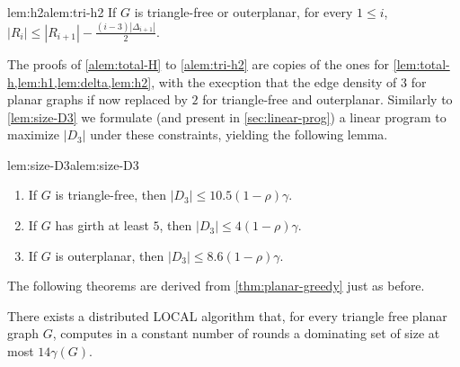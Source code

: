 \begin{adapted}{lem:h2}{alem:tri-h2}
  If $G$ is triangle-free or outerplanar,
  for every $1\le i$, $|R_i| \le |R_{i+1}| - \frac{(i-3)|\Delta_{i+1}|}{2}$.
\end{adapted}

The proofs of \ref{alem:total-H} to \ref{alem:tri-h2} are copies of the ones
for \cref{lem:total-h,lem:h1,lem:delta,lem:h2}, with the execption that the edge
density of $3$ for planar graphs if now replaced by $2$ for triangle-free and
outerplanar.
%
Similarly to \cref{lem:size-D3} we formulate (and present in
\cref{sec:linear-prog}) a linear program to maximize $|D_3|$ under these
constraints, yielding the following lemma.

%
\begin{adapted}{lem:size-D3}{alem:size-D3}
  \begin{enumerate}
    \item If $G$ is triangle-free, then  $|D_3|\le 10.5(1-\rho)\gamma$.\smallskip
    \item If $G$ has girth at least $5$, then $|D_3|\le 4(1-\rho)\gamma$.\smallskip
    \item If $G$ is outerplanar, then $|D_3|\le 8.6(1-\rho)\gamma$.
  \end{enumerate}
\end{adapted}

The following theorems are derived from \cref{thm:planar-greedy} just as before.

\begin{theorem}\label{thm:tri-2}
  There exists a distributed LOCAL algorithm that, for every triangle free planar
  graph $G$, computes in a constant number of rounds a dominating set
  of size at most $14\gamma(G)$.
\end{theorem}

